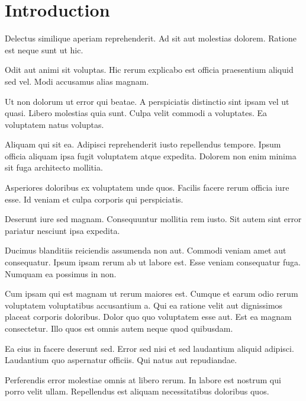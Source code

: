 \chapter{Introduction}\label{chap:in}

\renewcommand\chapterpath{Main/Intro}
\renewcommand\chapterfig{Main/Intro/Figures}

%

Delectus similique aperiam reprehenderit. Ad sit aut molestias dolorem. Ratione est neque sunt ut hic.

Odit aut animi sit voluptas. Hic rerum explicabo est officia praesentium aliquid sed vel. Modi accusamus alias magnam.

Ut non dolorum ut error qui beatae. A perspiciatis distinctio sint ipsam vel ut quasi. Libero molestias quia sunt. Culpa velit commodi a voluptates. Ea voluptatem natus voluptas.

Aliquam qui sit ea. Adipisci reprehenderit iusto repellendus tempore. Ipsum officia aliquam ipsa fugit voluptatem atque expedita. Dolorem non enim minima sit fuga architecto mollitia.

Asperiores doloribus ex voluptatem unde quos. Facilis facere rerum officia iure esse. Id veniam et culpa corporis qui perspiciatis.

Deserunt iure sed magnam. Consequuntur mollitia rem iusto. Sit autem sint error pariatur nesciunt ipsa expedita.

Ducimus blanditiis reiciendis assumenda non aut. Commodi veniam amet aut consequatur. Ipsum ipsam rerum ab ut labore est. Esse veniam consequatur fuga. Numquam ea possimus in non.

Cum ipsam qui est magnam ut rerum maiores est. Cumque et earum odio rerum voluptatem voluptatibus accusantium a. Qui ea ratione velit aut dignissimos placeat corporis doloribus. Dolor quo quo voluptatem esse aut. Est ea magnam consectetur. Illo quos est omnis autem neque quod quibusdam.

Ea eius in facere deserunt sed. Error sed nisi et sed laudantium aliquid adipisci. Laudantium quo aspernatur officiis. Qui natus aut repudiandae.

Perferendis error molestiae omnis at libero rerum. In labore est nostrum qui porro velit ullam. Repellendus est aliquam necessitatibus doloribus quos.
